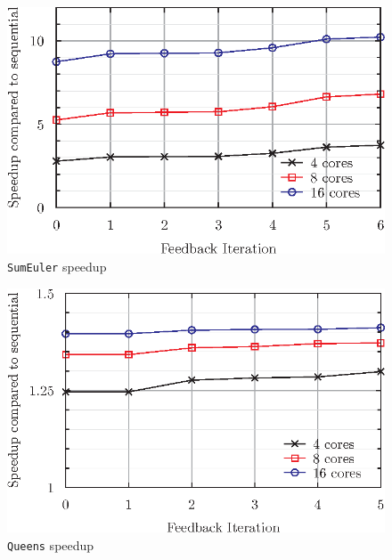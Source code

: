 \begin{figure}[h]
    \includegraphics[scale=0.75]{Informed/Figures/IterSum.eps}
    \caption[SE]{\texttt{SumEuler} speedup}
    \label{fig:iterSum}
\end{figure}
\begin{figure}[h]
    \includegraphics[scale=0.75]{Informed/Figures/IterQueens.eps}
    \caption[Q]{\texttt{Queens} speedup}
    \label{fig:iterQueens}
\end{figure}

